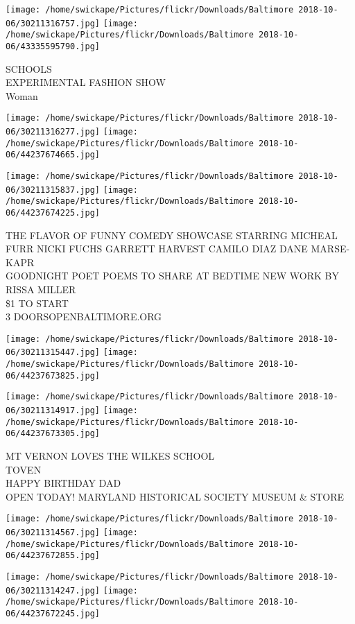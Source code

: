 \documentclass[10pt,letterpaper]{article}
\begin{document}
\vspace{0.25in}
\texttt{[image: /home/swickape/Pictures/flickr/Downloads/Baltimore 2018-10-06/30211316757.jpg]}
\texttt{[image: /home/swickape/Pictures/flickr/Downloads/Baltimore 2018-10-06/43335595790.jpg]}

SCHOOLS\\
EXPERIMENTAL FASHION SHOW\\
Woman
\pagebreak

\texttt{[image: /home/swickape/Pictures/flickr/Downloads/Baltimore 2018-10-06/30211316277.jpg]}
\texttt{[image: /home/swickape/Pictures/flickr/Downloads/Baltimore 2018-10-06/44237674665.jpg]}

\texttt{[image: /home/swickape/Pictures/flickr/Downloads/Baltimore 2018-10-06/30211315837.jpg]}
\texttt{[image: /home/swickape/Pictures/flickr/Downloads/Baltimore 2018-10-06/44237674225.jpg]}

THE FLAVOR OF FUNNY COMEDY SHOWCASE STARRING MICHEAL FURR NICKI FUCHS GARRETT HARVEST CAMILO DIAZ DANE MARSE{-}KAPR\\
GOODNIGHT POET POEMS TO SHARE AT BEDTIME NEW WORK BY RISSA MILLER\\
\$1 TO START\\
3 DOORSOPENBALTIMORE.ORG
\pagebreak

\texttt{[image: /home/swickape/Pictures/flickr/Downloads/Baltimore 2018-10-06/30211315447.jpg]}
\texttt{[image: /home/swickape/Pictures/flickr/Downloads/Baltimore 2018-10-06/44237673825.jpg]}

\texttt{[image: /home/swickape/Pictures/flickr/Downloads/Baltimore 2018-10-06/30211314917.jpg]}
\texttt{[image: /home/swickape/Pictures/flickr/Downloads/Baltimore 2018-10-06/44237673305.jpg]}

MT VERNON LOVES THE WILKES SCHOOL\\
TOVEN\\
HAPPY BIRTHDAY DAD\\
OPEN TODAY!  MARYLAND HISTORICAL SOCIETY MUSEUM \& STORE
\pagebreak

\texttt{[image: /home/swickape/Pictures/flickr/Downloads/Baltimore 2018-10-06/30211314567.jpg]}
\texttt{[image: /home/swickape/Pictures/flickr/Downloads/Baltimore 2018-10-06/44237672855.jpg]}

\texttt{[image: /home/swickape/Pictures/flickr/Downloads/Baltimore 2018-10-06/30211314247.jpg]}
\texttt{[image: /home/swickape/Pictures/flickr/Downloads/Baltimore 2018-10-06/44237672245.jpg]}
\end{document}
